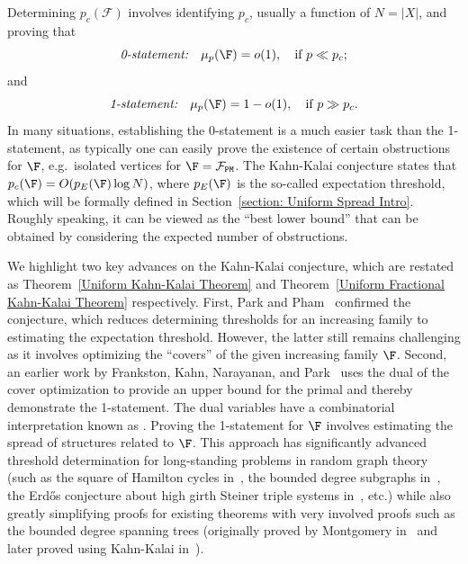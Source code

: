 \documentclass[12pt]{article}
\begin{document}
Determining $p_c(\mathcal{F})$ involves identifying $p_c$, usually a function of $N=|X|$, and proving that 
\[
{\text{{\em 0-statement:}}}\quad \mu_p(\F)=o(1), \quad\text{if $p\ll p_c$};
\]
and
\[
{\text{{\em 1-statement:}}}\quad\mu_p(\F)=1-o(1), \quad\text{if $p\gg p_c$}.
\]
In many situations, establishing the 0-statement is a much easier task than the 1-statement, as typically one can easily prove the existence of certain obstructions for $\F$, e.g.\ isolated vertices for $\F={\mathcal F}_{\texttt{PM}}$. The Kahn-Kalai conjecture states that
$p_c(\F)=O(p_E(\F) \log N)$, where $p_E(\F)$ is the so-called expectation threshold, which will be formally defined in Section~\ref{section: Uniform Spread Intro}. Roughly speaking, it can be viewed as the ``best lower bound'' that can be obtained by considering the expected number of obstructions. 




We highlight two key advances on the Kahn-Kalai conjecture, which are restated as Theorem~\ref{Uniform Kahn-Kalai Theorem} and Theorem~\ref{Uniform Fractional Kahn-Kalai Theorem} respectively. First, Park and Pham~\cite{park2023proofkahnkalaiconjecture} confirmed the conjecture, which reduces determining thresholds for an increasing family to estimating the expectation threshold. However, the latter still remains challenging as it involves optimizing the ``covers'' of the given increasing family $\F$. Second, an earlier work by Frankston, Kahn, Narayanan, and Park~\cite{frankston2019thresholds} uses the dual of the cover optimization to provide an upper bound for the primal and thereby demonstrate the 1-statement. The dual variables have a combinatorial interpretation known as . Proving the 1-statement for $\F$ involves estimating the spread of structures related to $\F$. This approach has significantly advanced threshold determination for long-standing problems in random graph theory (such as the square of Hamilton cycles in~\cite{kahn2020thresholdsquarehamiltoncycle}, the bounded degree subgraphs in~\cite{frankston2019thresholds}, the Erd\H{o}s conjecture about high girth Steiner triple systems in~\cite{kwan2024highgirthsteinertriplesystems}, etc.) while also greatly simplifying proofs for existing theorems with very involved proofs such as the bounded degree spanning trees (originally proved by Montgomery in~\cite{montgomery2019spanningtreesrandomgraphs} and later proved using Kahn-Kalai in~\cite{frankston2019thresholds}).
\end{document}
